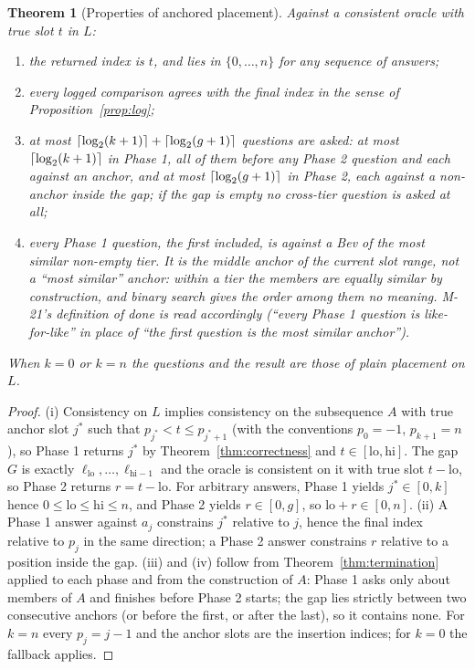 \documentclass[11pt]{article}
\DeclarePairedDelimiter\ceil{\lceil}{\rceil}
\theoremstyle{plain}
\newtheorem{theorem}{Theorem}[section]
\theoremstyle{definition}
\theoremstyle{remark}
\begin{document}
\begin{theorem}[Properties of anchored placement]\label{thm:anchored}
Against a consistent oracle with true slot $t$ in $L$:
\begin{enumerate}[label=(\roman*)]
\item the returned index is $t$, and lies in $\{0, \dots, n\}$ for any sequence of answers;
\item every logged comparison agrees with the final index in the sense of Proposition~\ref{prop:log};
\item at most $\ceil{\log_2(k+1)} + \ceil{\log_2(g+1)}$ questions are asked: at most $\ceil{\log_2(k+1)}$ in Phase 1, all of them before any Phase 2 question and each against an anchor, and at most $\ceil{\log_2(g+1)}$ in Phase 2, each against a non-anchor inside the gap; if the gap is empty no cross-tier question is asked at all;
\item every Phase 1 question, the first included, is against a Bev of the most similar non-empty tier. It is the \emph{middle} anchor of the current slot range, not a ``most similar'' anchor: within a tier the members are equally similar by construction, and binary search gives the order among them no meaning. M-21's definition of done is read accordingly (``every Phase 1 question is like-for-like'' in place of ``the first question is the most similar anchor'').
\end{enumerate}
When $k = 0$ or $k = n$ the questions and the result are those of plain placement on $L$.
\end{theorem}
\begin{proof}
(i) Consistency on $L$ implies consistency on the subsequence $A$ with true anchor slot $j^\ast$ such that $p_{j^\ast} < t \le p_{j^\ast+1}$ (with the conventions $p_0 = -1$, $p_{k+1} = n$), so Phase 1 returns $j^\ast$ by Theorem~\ref{thm:correctness} and $t \in [\mathrm{lo}, \mathrm{hi}]$. The gap $G$ is exactly $\ell_{\mathrm{lo}}, \dots, \ell_{\mathrm{hi}-1}$ and the oracle is consistent on it with true slot $t - \mathrm{lo}$, so Phase 2 returns $r = t - \mathrm{lo}$. For arbitrary answers, Phase 1 yields $j^\ast \in [0, k]$ hence $0 \le \mathrm{lo} \le \mathrm{hi} \le n$, and Phase 2 yields $r \in [0, g]$, so $\mathrm{lo} + r \in [0, n]$. (ii) A Phase 1 answer against $a_j$ constrains $j^\ast$ relative to $j$, hence the final index relative to $p_j$ in the same direction; a Phase 2 answer constrains $r$ relative to a position inside the gap. (iii) and (iv) follow from Theorem~\ref{thm:termination} applied to each phase and from the construction of $A$: Phase 1 asks only about members of $A$ and finishes before Phase 2 starts; the gap lies strictly between two consecutive anchors (or before the first, or after the last), so it contains none. For $k = n$ every $p_j = j - 1$ and the anchor slots are the insertion indices; for $k = 0$ the fallback applies.
\end{proof}
\end{document}
